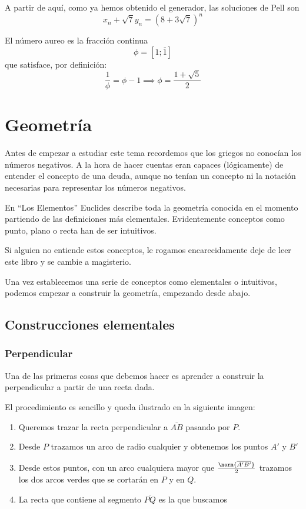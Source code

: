 \documentclass{apuntes}
\begin{document}
A partir de aquí, como ya hemos obtenido el generador, las soluciones de Pell son
\[x_n + \sqrt{7}y_n = \left(8 + 3 \sqrt{7}\right)^n\]

\begin{defn}
El número aureo es la fracción continua
\[\phi=[1;\overline{1}]\]
que satisface, por definición:
\[\frac{1}{\phi} = \phi -1 \implies \phi = \frac{1+\sqrt{5}}{2}\]
\end{defn}

\chapter{Geometría}
Antes de empezar a estudiar este tema recordemos que los griegos no conocían los números negativos. A la hora de hacer cuentas eran capaces (lógicamente) de entender el concepto de una deuda, aunque no tenían un concepto ni la notación necesarias para representar los números negativos.

En ``Los Elementos'' Euclides describe toda la geometría conocida en el momento partiendo de las definiciones más elementales. Evidentemente conceptos como punto, plano o recta han de ser intuitivos.

Si alguien no entiende estos conceptos, le rogamos encarecidamente deje de leer este libro y se cambie a magisterio.

Una vez establecemos una serie de conceptos como elementales o intuitivos, podemos empezar a construir la geometría, empezando desde abajo.

\section{Construcciones elementales}
\subsection{Perpendicular}
Una de las primeras cosas que debemos hacer es aprender a construir la perpendicular a partir de una recta dada.

El procedimiento es sencillo y queda ilustrado en la siguiente imagen:

\begin{minipage}{0.4\textwidth}
\begin{center}
\end{center}
\end{minipage}
\begin{minipage}{0.57\textwidth}
\begin{enumerate}
\item Queremos trazar la recta perpendicular a $\overline{AB}$ pasando por $P$.
\item Desde $P$ trazamos un arco de radio cualquier y obtenemos los puntos $A'$ y $B'$
\item Desde estos puntos, con un arco cualquiera mayor que $\frac{\norm{\overline{A'B'}}}{2}$ trazamos los dos arcos verdes que se cortarán en $P$ y en $Q$.
\item La recta que contiene al segmento $\overline{PQ}$ es la que buscamos
\end{enumerate}
\end{minipage}
\end{document}
